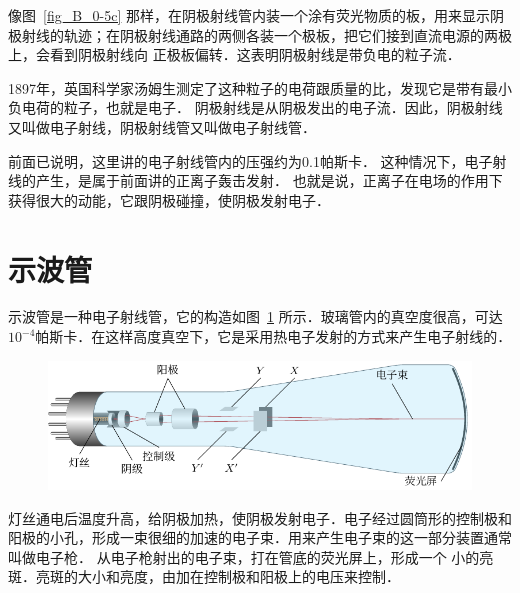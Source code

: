 像图~\ref{fig_B_0-5c}  那样，在阴极射线管内装一个涂有荧光物质的板，用来显示阴极射线的轨迹；在阴极射线通路的两侧各装一个极板，把它们接到直流电源的两极上，会看到阴极射线向
正极板偏转．这表明阴极射线是带负电的粒子流．

1897年，英国科学家汤姆生测定了这种粒子的电荷跟质量的比，发现它是带有最小负电荷的粒子，也就是电子．
阴极射线是从阴极发出的电子流．因此，阴极射线又叫做电子射线，阴极射线管又叫做电子射线管．

前面已说明，这里讲的电子射线管内的压强约为0.1帕斯卡．
这种情况下，电子射线的产生，是属于前面讲的正离子轰击发射．
也就是说，正离子在电场的作用下获得很大的动能，它跟阴极碰撞，使阴极发射电子．

\section{示波管}
示波管是一种电子射线管，它的构造如图~\ref{fig_B_8-14} 所示．玻璃管内的真空度很高，可达$10^{-4}$帕斯卡．在这样高度真空下，它是采用热电子发射的方式来产生电子射线的．
\begin{figure}[htbp]
    \centering
    \includegraphics{fig/B/8-14.pdf}
    \caption{}\label{fig_B_8-14}
\end{figure}

灯丝通电后温度升高，给阴极加热，使阴极发射电子．电子经过圆筒形的控制极和阳极的小孔，形成一束很细的加速的电子束．用来产生电子束的这一部分装置通常叫做电子枪．
从电子枪射出的电子束，打在管底的荧光屏上，形成一个
小的亮斑．亮斑的大小和亮度，由加在控制极和阳极上的电压来控制．

